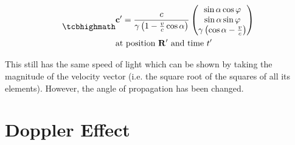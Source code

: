 
\begin{equation}
	\label{eq: velocity transform for light}
	\mhl{
		\begin{aligned}
			 & \mathbf{c}{'} = \dfrac{c}{{\gamma}\left(1- \frac{v}{c} \cos\alpha\right) }
			\begin{pmatrix}
				\sin\alpha\cos\varphi                            \\
				\sin\alpha\sin\varphi                            \\
				{\gamma} \left( \cos\alpha - \frac{v}{c} \right) \\
			\end{pmatrix}
			\\
			 & \text{at position $\mathbf{R}{'}$ and time $t{'}$ }
		\end{aligned}
	}
\end{equation}

This still has the same speed of light which can be shown by taking the magnitude of the velocity vector (i.e.
the square root of the squares of all its elements).
However, the angle of propagation has been changed.

\section{Doppler Effect}

